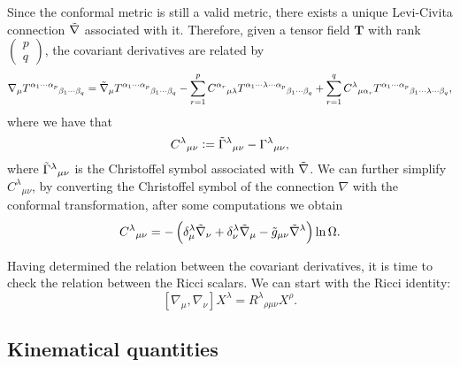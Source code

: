 Since the conformal metric is still a valid metric, there exists a unique Levi-Civita connection $\Tilde{\nabla}$ associated with it. Therefore, given a tensor field $\mathbf{T}$ with rank $\begin{pmatrix}p\\q\end{pmatrix}$, the covariant derivatives are related by
\begin{equation}
    \nabla_\mu T^{\alpha_1\cdots \alpha_p}{}_{\beta_1\cdots\beta_q}=\Tilde{\nabla}_\mu T^{\alpha_1\cdots \alpha_p}{}_{\beta_1\cdots\beta_q} - \sum_{r=1}^p C^{\alpha_r}{}_{\mu\lambda}T^{\alpha_1\cdots \lambda \cdots \alpha_p}{}_{\beta_1\cdots\beta_q} + \sum_{r=1}^q C^{\lambda}{}_{\mu \alpha_r}T^{\alpha_1 \cdots \alpha_p}{}_{\beta_1\cdots \lambda\cdots\beta_q},
    \label{eqn:spacetime_cov_derivatives}
\end{equation}
where we have that
\begin{equation}
    C^\lambda{}_{\mu\nu}:=\Tilde{\Gamma}^\lambda{}_{\mu\nu}-\Gamma^\lambda{}_{\mu\nu},
\end{equation}
where $\Tilde{\Gamma}^\lambda{}_{\mu\nu}$ is the Christoffel symbol associated with $\Tilde{\nabla}$. We can further simplify $C^\lambda{}_{\mu\nu}$, by converting the Christoffel symbol of the connection $\nabla$ with the conformal transformation, after some computations we obtain
\begin{equation}
    C^\lambda{}_{\mu\nu}=-\left(\delta^\lambda_\mu \Tilde{\nabla}_\nu + \delta^\lambda_\nu \Tilde{\nabla}_\mu - \Tilde{g}_{\mu\nu}\Tilde{\nabla}^\lambda\right)\ln\Omega.
    \label{eqn:dif_christ_C}
\end{equation}

Having determined the relation between the covariant derivatives, it is time to check the relation between the Ricci scalars. We can start with the Ricci identity:
\begin{equation}
    \left[\nabla_\mu,\nabla_\nu\right]X^\lambda=R^\lambda{}_{\rho\mu\nu}X^{\rho}.
\end{equation}









\subsection{Kinematical quantities}


